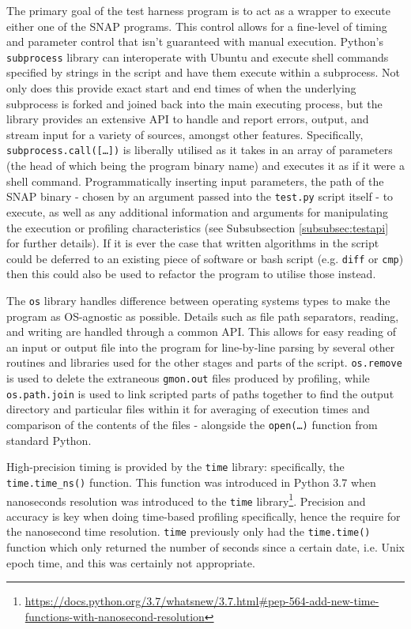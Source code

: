 \documentclass[conference]{IEEEtran}
\begin{document}
The primary goal of the test harness program is to act as a wrapper to execute either one of the SNAP programs. This control allows for a fine-level of timing and parameter control that isn't guaranteed with manual execution. Python's \texttt{subprocess} library can interoperate with Ubuntu and execute shell commands specified by strings in the script and have them execute within a subprocess. Not only does this provide exact start and end times of when the underlying subprocess is forked and joined back into the main executing process, but the library provides an extensive API to handle and report errors, output, and stream input for a variety of sources, amongst other features. Specifically, \texttt{subprocess.call([\dots])} is liberally utilised as it takes in an array of parameters (the head of which being the program binary name) and executes it as if it were a shell command. Programmatically inserting input parameters, the path of the SNAP binary - chosen by an argument passed into the \texttt{test.py} script itself - to execute, as well as any additional information and arguments for manipulating the execution or profiling characteristics (see Subsubsection \ref{subsubsec:testapi} for further details). If it is ever the case that written algorithms in the script could be deferred to an existing piece of software or bash script (e.g. \texttt{diff} or \texttt{cmp}) then this could also be used to refactor the program to utilise those instead.

The \texttt{os} library handles difference between operating systems types to make the program as OS-agnostic as possible. Details such as file path separators, reading, and writing are handled through a common API. This allows for easy reading of an input or output file into the program for line-by-line parsing by several other routines and libraries used for the other stages and parts of the script. \texttt{os.remove} is used to delete the extraneous \texttt{gmon.out} files produced by profiling, while \texttt{os.path.join} is used to link scripted parts of paths together to find the output directory and particular files within it for averaging of execution times and comparison of the contents of the files - alongside the \texttt{open(\dots)} function from standard Python.

High-precision timing is provided by the \texttt{time} library: specifically, the \texttt{time.time\_ns()} function. This function was introduced in Python 3.7 when nanoseconds resolution was introduced to the \texttt{time} library\footnote{\url{https://docs.python.org/3.7/whatsnew/3.7.html#pep-564-add-new-time-functions-with-nanosecond-resolution}}. Precision and accuracy is key when doing time-based profiling specifically, hence the require for the nanosecond time resolution. \texttt{time} previously only had the \texttt{time.time()} function which only returned the number of seconds since a certain date, i.e. Unix epoch time, and this was certainly not appropriate. 
\end{document}
